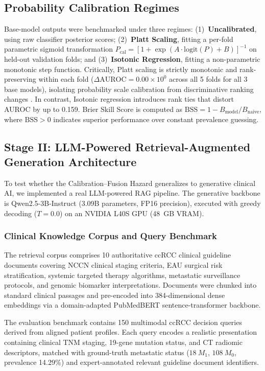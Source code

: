 \subsection{Probability Calibration Regimes}
Base-model outputs were benchmarked under three regimes: (1)~\textbf{Uncalibrated}, using raw classifier posterior scores; (2)~\textbf{Platt Scaling}, fitting a per-fold parametric sigmoid transformation $P_{\text{cal}} = [1 + \exp(A \cdot \text{logit}(P) + B)]^{-1}$ on held-out validation folds; and (3)~\textbf{Isotonic Regression}, fitting a non-parametric monotonic step function. Critically, Platt scaling is strictly monotonic and rank-preserving within each fold ($\Delta \text{AUROC} = 0.00 \times 10^0$ across all 5 folds for all 3 base models), isolating probability scale calibration from discriminative ranking changes \cite{chen2016calibrating, maierhein2024metrics}. In contrast, Isotonic regression introduces rank ties that distort AUROC by up to 0.159. Brier Skill Score is computed as $\text{BSS} = 1 - B_{\text{model}} / B_{\text{naive}}$, where $\text{BSS} > 0$ indicates superior performance over constant prevalence guessing.

\subsection{Stage II: LLM-Powered Retrieval-Augmented Generation Architecture}
\label{sec:rag_methods}

To test whether the Calibration--Fusion Hazard generalizes to generative clinical AI, we implemented a real LLM-powered RAG pipeline. The generative backbone is Qwen2.5-3B-Instruct (3.09B parameters, FP16 precision), executed with greedy decoding ($T = 0.0$) on an NVIDIA L40S GPU (48~GB VRAM).

\subsubsection{Clinical Knowledge Corpus and Query Benchmark}
The retrieval corpus comprises 10 authoritative ccRCC clinical guideline documents covering NCCN clinical staging criteria, EAU surgical risk stratification, systemic targeted therapy algorithms, metastatic surveillance protocols, and genomic biomarker interpretations. Documents were chunked into standard clinical passages and pre-encoded into 384-dimensional dense embeddings via a domain-adapted PubMedBERT sentence-transformer backbone.

The evaluation benchmark contains 150 multimodal ccRCC decision queries derived from aligned patient profiles. Each query encodes a realistic presentation containing clinical TNM staging, 19-gene mutation status, and CT radiomic descriptors, matched with ground-truth metastatic status ($18~M_1$, $108~M_0$, prevalence 14.29\%) and expert-annotated relevant guideline document identifiers.

